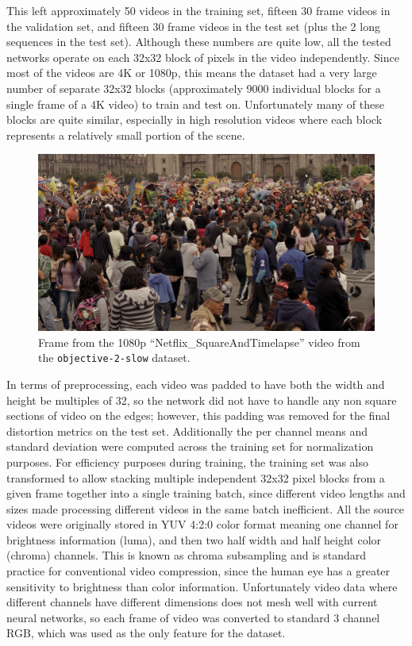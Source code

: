 \documentclass[10pt,twocolumn,letterpaper]{article}
\begin{document}
This left approximately 50 videos in the training set, fifteen 30 frame videos in the validation set, and fifteen 30 frame videos in the test set (plus the 2 long sequences in the test set). Although these numbers are quite low, all the tested networks operate on each 32x32 block of pixels in the video independently. Since most of the videos are 4K or 1080p, this means the dataset had a very large number of separate 32x32 blocks (approximately 9000 individual blocks for a single frame of a 4K video) to train and test on. Unfortunately many of these blocks are quite similar, especially in high resolution videos where each block represents a relatively small portion of the scene.

\begin{figure}[t]
\begin{center}
  \includegraphics[width=0.8\linewidth]{data_example}
\end{center}
   \caption{Frame from the 1080p ``Netflix\_SquareAndTimelapse'' video from the \texttt{objective-2-slow} dataset.}
\end{figure}

In terms of preprocessing, each video was padded to have both the width and height be multiples of 32, so the network did not have to handle any non square sections of video on the edges; however, this padding was removed for the final distortion metrics on the test set. Additionally the per channel means and standard deviation were computed across the training set for normalization purposes. For efficiency purposes during training, the training set was also transformed to allow stacking multiple independent 32x32 pixel blocks from a given frame together into a single training batch, since different video lengths and sizes made processing different videos in the same batch inefficient. All the source videos were originally stored in YUV 4:2:0 color format meaning one channel for brightness information (luma), and then two half width and half height color (chroma) channels. This is known as chroma subsampling \cite{van2001vision} and is standard practice for conventional video compression, since the human eye has a greater sensitivity to brightness than color information. Unfortunately video data where different channels have different dimensions does not mesh well with current neural networks, so each frame of video was converted to standard 3 channel RGB, which was used as the only feature for the dataset.
\end{document}
